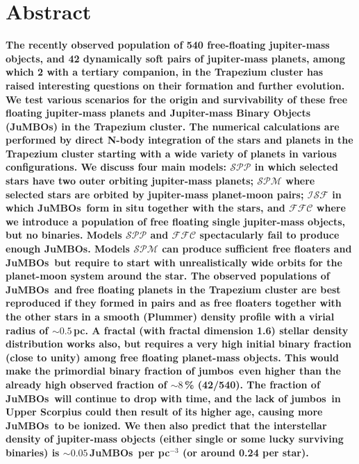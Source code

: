 \documentclass[submission,phys]{lib/SciPost}
\newcommand{\jumbos}{\mbox{JuMBOs}}
\begin{document}
\section*{Abstract} {\bf 
      The recently observed population of 540 free-floating
      jupiter-mass objects, and 42 dynamically soft pairs of
      jupiter-mass planets, among which 2 with a tertiary companion,
      in the Trapezium cluster has raised interesting questions on
      their formation and further evolution.  We test various
      scenarios for the origin and survivability of these free
      floating jupiter-mass planets and Jupiter-mass Binary Objects
      (JuMBOs) in the Trapezium cluster.  The numerical calculations
      are performed by direct N-body integration of the stars and
      planets in the Trapezium cluster starting with a wide variety of
      planets in various configurations. We discuss four main models:
      $\mathcal{SPP}$ in which selected stars have two outer orbiting
      jupiter-mass planets; $\mathcal{SPM}$ where selected stars are
      orbited by jupiter-mass planet-moon pairs; $\mathcal{ISF}$ in
      which \jumbos\, form in situ together with the stars, and
      $\mathcal{FFC}$ where we introduce a population of free floating
      single jupiter-mass objects, but no binaries.  Models
      $\mathcal{SPP}$ and $\mathcal{FFC}$ spectacularly fail to
      produce enough \jumbos. Models $\mathcal{SPM}$ can produce
      sufficient free floaters and \jumbos\, but require to start with
      unrealistically wide orbits for the planet-moon system around
      the star. The observed
      populations of \jumbos\, and free floating planets in the
      Trapezium cluster are best reproduced if they formed in pairs
      and as free floaters together with the other stars in a smooth
      (Plummer) density profile with a virial radius of $\sim
      0.5$\,pc.  A fractal (with fractal dimension 1.6) stellar
      density distribution works also, but requires a very high
      initial binary fraction (close to unity) among free floating
      planet-mass objects.  This would make the primordial binary
      fraction of jumbos\, even higher than the already high observed
      fraction of $\sim 8$\,\% (42/540). The fraction of \jumbos\,
      will continue to drop with time, and the lack of jumbos\, in
      Upper Scorpius could then result of its higher age, causing more
      \jumbos\, to be ionized. We then also predict that the
      interstellar density of jupiter-mass objects (either single or
      some lucky surviving binaries) is $\sim 0.05$\,\jumbos\, per
      pc$^{-3}$ (or around 0.24 per star).  }
   
\end{document}
